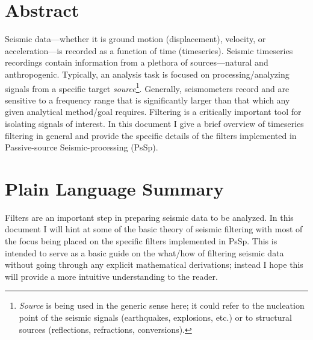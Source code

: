 \documentclass[american, twoside]{article}
\begin{document}
\begin{tcolorbox}
    \section*{Abstract} \label{Abstract}
    Seismic data---whether it is ground motion (displacement), velocity, or acceleration---is recorded as a function of time (timeseries). Seismic timeseries
    recordings contain information from a plethora of sources---natural and anthropogenic. Typically, an analysis task is focused on processing/analyzing
    signals from a specific target \textit{source}\footnote{\textit{Source} is being used in the generic sense here; it could refer to the nucleation point of the seismic
    signals (earthquakes, explosions, etc.) or to structural sources (reflections, refractions, conversions).}. Generally, seismometers record and are sensitive
    to a frequency range that is significantly larger than that which any given analytical method/goal requires. Filtering is a critically important tool for
    isolating signals of interest. In this document I give a brief overview of timeseries filtering in general and provide the specific details of the filters
    implemented in Passive-source Seismic-processing (PsSp).
    \section*{Plain Language Summary} \label{PlainSummary}
    Filters are an important step in preparing seismic data to be analyzed. In this document I will hint at some of the basic theory of seismic filtering
    with most of the focus being placed on the specific filters implemented in PsSp. This is intended to serve as a basic guide on the what/how of filtering seismic data without going through
    any explicit mathematical derivations; instead I hope this will provide a more intuitive understanding to the reader.
\end{tcolorbox}

\newpage
\begin{tcolorbox}
    \renewcommand\cftsecfont{\large}
    \renewcommand\cftsecpagefont{\small}
    \tableofcontents
\end{tcolorbox}
\end{document}
